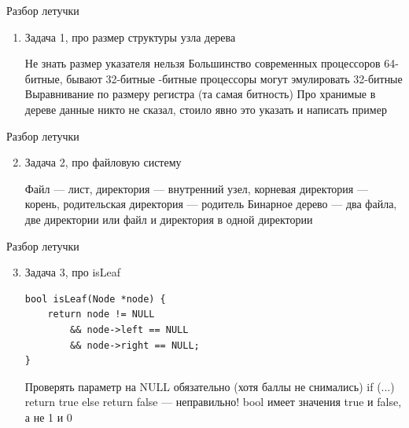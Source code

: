 \documentclass{../../slides-style}
\begin{document}
    
    \begin{frame}[plain]
        \titlepage
    \end{frame}

    \begin{frame}{Разбор летучки}
        \begin{enumerate}
            \item Задача 1, про размер структуры узла дерева
            \begin{outline}
                \1 Не знать размер указателя нельзя
                    \2 Большинство современных процессоров 64-битные, бывают 32-битные
                    -битные процессоры могут эмулировать 32-битные
                \1 Выравнивание по размеру регистра (та самая битность)
                \1 Про хранимые в дереве данные никто не сказал, стоило явно это указать и написать пример
            \end{outline}
        \end{enumerate}
    \end{frame}

    \begin{frame}{Разбор летучки}
        \begin{enumerate}
            \setcounter{enumi}{1}
            \item Задача 2, про файловую систему
            \begin{outline}
                \1 Файл --- лист, директория --- внутренний узел, корневая директория --- корень, родительская директория --- родитель
                \1 Бинарное дерево --- два файла, две директории или файл и директория в одной директории
            \end{outline}
        \end{enumerate}
    \end{frame}

    \begin{frame}[fragile]{Разбор летучки}
        \begin{enumerate}
            \setcounter{enumi}{2}
            \item Задача 3, про isLeaf
            \begin{verbatim}
bool isLeaf(Node *node) {
    return node != NULL 
        && node->left == NULL 
        && node->right == NULL;
}
            \end{verbatim}
            \begin{outline}
                \1 Проверять параметр на NULL обязательно (хотя баллы не снимались)
                \1 if (...) return true else return false --- неправильно!
                \1 bool имеет значения true и false, а не 1 и 0
            \end{outline}
        \end{enumerate}
    \end{frame}
\end{document}
